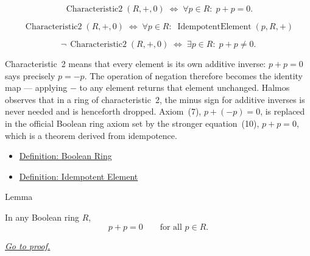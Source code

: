 \begin{remark*}
\[
\operatorname{Characteristic2}(R,+,0)
\;\Longleftrightarrow\;
\forall p \in R{:}\; p + p = 0.
\]
\end{remark*}

\begin{remark*}
\[
\operatorname{Characteristic2}(R,+,0)
\;\Longleftrightarrow\;
\forall p \in R{:}\;
\operatorname{IdempotentElement}(p, R, +)
\]
\end{remark*}

\begin{remark*}
\[
\neg\,\operatorname{Characteristic2}(R,+,0)
\;\Longleftrightarrow\;
\exists p \in R{:}\; p + p \neq 0.
\]
\end{remark*}

\begin{remark*}[Interpretation]
Characteristic~2 means that every element is its own additive
inverse: $p + p = 0$ says precisely $p = -p$.  The operation of
negation therefore becomes the identity map --- applying $-$ to
any element returns that element unchanged.  Halmos observes that
in a ring of characteristic~2, the minus sign for additive inverses
is never needed and is henceforth dropped.  Axiom~(7),
$p + (-p) = 0$, is replaced in the official Boolean ring axiom set
by the stronger equation~(10), $p + p = 0$, which is a theorem
derived from idempotence.
\end{remark*}

\begin{dependencies}
\begin{itemize}
  \item \hyperref[def:boolean-ring]{Definition: Boolean Ring}
  \item \hyperref[def:idempotent-element]{Definition: Idempotent Element}
\end{itemize}
\end{dependencies}


\begin{lemmabox}{Lemma}
\begin{lemma}
\label{lem:self-additive-inverse}
In any Boolean ring $R$,
\[
p + p = 0 \qquad \text{for all } p \in R.
\]

\smallskip
\noindent
\hyperref[prf:self-additive-inverse]{\textit{Go to proof.}}
\end{lemma}
\end{lemmabox}

